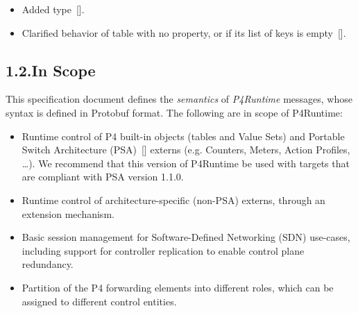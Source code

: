 \documentclass[11pt]{article}
\begin{document}
{\begin{itemize}[noitemsep,topsep=\mdcompacttopsep]
\item{}Added  type~[].%

\item{}Clarified behavior of table with no  property, or if its list
of keys is empty~[].%
\end{itemize}%

\subsection{1.2.\hspace*{0.5em}In Scope}\label{sec-in-scope}%

\noindent{}This specification document defines the \emph{semantics} of \emph{P4Runtime} messages,
whose syntax is defined in Protobuf format. The following are in scope of
P4Runtime:%

\begin{itemize}[noitemsep,topsep=\mdcompacttopsep]%

\item{}Runtime control of P4 built-in objects (tables and Value Sets) and Portable
Switch Architecture (PSA)~[] externs (e.g. Counters, Meters, Action
Profiles, \dots{}). We recommend that this version of P4Runtime be used with
targets that are compliant with PSA version 1.1.0.%

\item{}Runtime control of architecture-specific (non-PSA) externs, through an
extension mechanism.%

\item{}Basic session management for Software-Defined Networking (SDN) use-cases,
including support for controller replication to enable control plane
redundancy.%

\item{}Partition of the P4 forwarding elements into different roles, which can be
assigned to different control entities.%


\end{itemize}}
\end{document}
